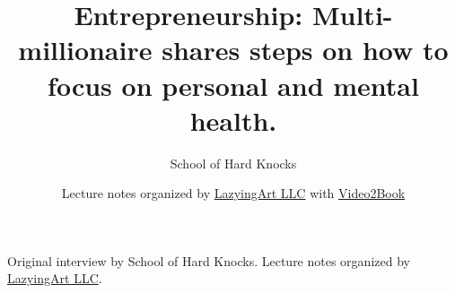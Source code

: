 \documentclass[11pt,oneside]{book}
\begin{document}
\frontmatter
\title{Entrepreneurship: Multi-millionaire shares steps on how to focus on personal and mental health.}
\author{School of Hard Knocks}
\date{Lecture notes organized by \href{https://lazying.art}{LazyingArt LLC} with \href{https://github.com/lachlanchen/Video2Book}{Video2Book}}
\maketitle
\begin{center}
\small Original interview by School of Hard Knocks. Lecture notes organized by \href{https://lazying.art}{LazyingArt LLC}.
\end{center}
\clearpage
\mainmatter

\end{document}
